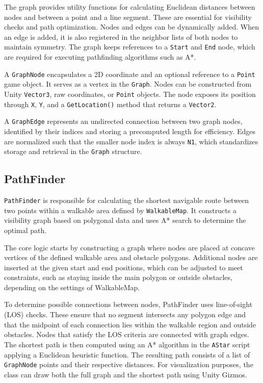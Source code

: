 The graph provides utility functions for calculating Euclidean distances between nodes and between a point and a line segment. These are essential for visibility checks and path optimization. Nodes and edges can be dynamically added. When an edge is added, it is also registered in the neighbor lists of both nodes to maintain symmetry. The graph keeps references to a \verb|Start| and \verb|End| node, which are required for executing pathfinding algorithms such as A*.

 A \verb|GraphNode| encapsulates a 2D coordinate and an optional reference to a \verb|Point| game object. It serves as a vertex in the \verb|Graph|. Nodes can be constructed from Unity \verb|Vector3|, raw coordinates, or \verb|Point| objects. The node exposes its position through \verb|X|, \verb|Y|, and a \verb|GetLocation()| method that returns a \verb|Vector2|.

 A \verb|GraphEdge| represents an undirected connection between two graph nodes, identified by their indices and storing a precomputed length for efficiency. Edges are normalized such that the smaller node index is always \verb|N1|, which standardizes storage and retrieval in the \verb|Graph| structure.


\subsection{PathFinder}
\verb|PathFinder| is responsible for calculating the shortest navigable route between two points within a walkable area defined by \verb|WalkableMap|. It constructs a visibility graph based on polygonal data and uses A* search to determine the optimal path.

The core logic starts by constructing a graph where nodes are placed at concave vertices of the defined walkable area and obstacle polygons. Additional nodes are inserted at the given start and end positions, which can be adjusted to meet constraints, such as staying inside the main polygon or outside obstacles, depending on the settings of WalkableMap.

To determine possible connections between nodes, PathFinder uses line-of-sight (LOS) checks. These ensure that no segment intersects any polygon edge and that the midpoint of each connection lies within the walkable region and outside obstacles. Nodes that satisfy the LOS criteria are connected with graph edges. The shortest path is then computed using an A* algorithm in the \verb|AStar| script applying a Euclidean heuristic function.  The resulting path consists of a list of \verb|GraphNode| points and their respective distances. For visualization purposes, the class can draw both the full graph and the shortest path using Unity Gizmos.


